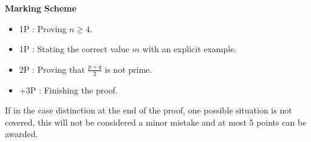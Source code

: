 {\textbf{Marking Scheme}
\begin{itemize}
    \item 1P : Proving $n\geq 4$.
    \item 1P : Stating the correct value $m$ with an explicit example.
    \item 2P : Proving that $\frac{p+q}{2}$ is not prime.
    \item +3P : Finishing the proof.
\end{itemize}

If in the case distinction at the end of the proof, one possible situation is not covered, this will not be considered a minor mistake and at most 5 points can be awarded.
}






\newpage